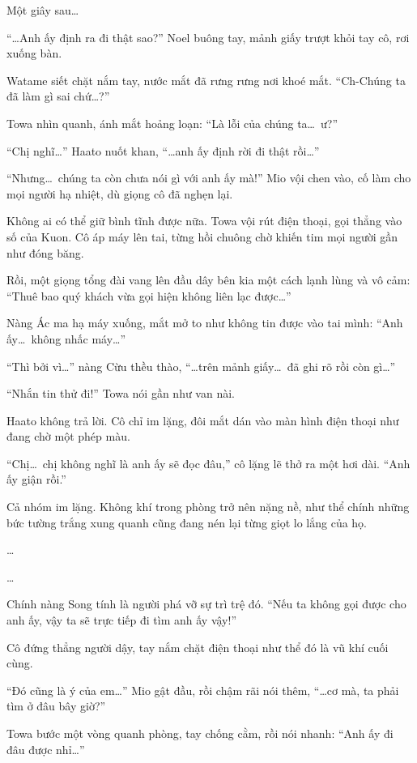 \documentclass[../main.tex]{subfiles}
\begin{document}
Một giây sau\dots

``\dots Anh ấy định ra đi thật sao?'' Noel buông tay, mảnh giấy trượt khỏi tay cô, rơi xuống bàn.

Watame siết chặt nắm tay, nước mắt đã rưng rưng nơi khoé mắt. ``Ch-Chúng ta đã làm gì sai chứ\dots?''

Towa nhìn quanh, ánh mắt hoảng loạn: ``Là lỗi của chúng ta\dots\ ư?''

``Chị nghĩ\dots'' Haato nuốt khan, ``\dots anh ấy định rời đi thật rồi\dots''

``Nhưng\dots\ chúng ta còn chưa nói gì với anh ấy mà!'' Mio vội chen vào, cố làm cho mọi người hạ nhiệt, dù giọng cô đã nghẹn lại.

Không ai có thể giữ bình tĩnh được nữa. Towa vội rút điện thoại, gọi thẳng vào số của Kuon. Cô áp máy lên tai, từng hồi chuông chờ khiến tim mọi người gần như đóng băng.

Rồi, một giọng tổng đài vang lên đầu dây bên kia một cách lạnh lùng và vô cảm: ``Thuê bao quý khách vừa gọi hiện không liên lạc được\dots''

Nàng Ác ma hạ máy xuống, mắt mở to như không tin được vào tai mình: ``Anh ấy\dots\ không nhấc máy\dots''

``Thì bởi vì\dots'' nàng Cừu thều thào, ``\dots trên mảnh giấy\dots\ đã ghi rõ rồi còn gì\dots''

``Nhắn tin thử đi!'' Towa nói gần như van nài.

Haato không trả lời. Cô chỉ im lặng, đôi mắt dán vào màn hình điện thoại như đang chờ một phép màu.

``Chị\dots\ chị không nghĩ là anh ấy sẽ đọc đâu,'' cô lặng lẽ thở ra một hơi dài. ``Anh ấy giận rồi.''

Cả nhóm im lặng. Không khí trong phòng trở nên nặng nề, như thể chính những bức tường trắng xung quanh cũng đang nén lại từng giọt lo lắng của họ.

\dots

\dots

Chính nàng Song tính là người phá vỡ sự trì trệ đó. ``Nếu ta không gọi được cho anh ấy, vậy ta sẽ trực tiếp đi tìm anh ấy vậy!''

Cô đứng thẳng người dậy, tay nắm chặt điện thoại như thể đó là vũ khí cuối cùng.

``Đó cũng là ý của em\dots'' Mio gật đầu, rồi chậm rãi nói thêm, ``\dots cơ mà, ta phải tìm ở đâu bây giờ?''

Towa bước một vòng quanh phòng, tay chống cằm, rồi nói nhanh: ``Anh ấy đi đâu được nhỉ\dots''
\end{document}
